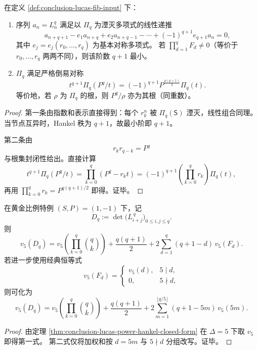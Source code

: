 \begin{proposition}[最小递推与倒易对称]\label{prop:conclusion-lucas-power-minpoly-reciprocity}
在定义 \ref{def:conclusion-lucas-fib-input} 下：
\begin{enumerate}
  \item 序列 \(a_n=L_n^q\) 满足以 \(\Pi_q\) 为湮灭多项式的线性递推
  \[
  a_{n+q+1}
  -e_1 a_{n+q}
  +e_2 a_{n+q-1}
  -\cdots
  +(-1)^{q+1}e_{q+1}a_n=0,
  \]
  其中 \(e_j=e_j(r_0,\dots,r_q)\) 为基本对称多项式。
  若 \(\prod_{d=1}^{q}F_d\neq 0\)（等价于 \(r_0,\dots,r_q\) 两两不同），则该阶数 \(q+1\) 最小。
  \item \(\Pi_q\) 满足严格倒易对称
  \[
  t^{q+1}\Pi_q(P^q/t)
  =
  (-1)^{q+1}P^{\frac{q(q+1)}{2}}\Pi_q(t).
  \]
  等价地，若 \(\rho\) 为 \(\Pi_q\) 的根，则 \(P^q/\rho\) 亦为其根（同重数）。
\end{enumerate}
\end{proposition}
\begin{proof}
第一条由指数和表示直接得到：每个 \(r_k^n\) 被 \(\Pi_q(\mathsf S)\) 湮灭，线性组合同理。
当节点互异时，Hankel 秩为 \(q+1\)，故最小阶即 \(q+1\)。

第二条由
\[
r_k r_{q-k}=P^q
\]
与根集封闭性给出。直接计算
\[
t^{q+1}\Pi_q(P^q/t)
=\prod_{k=0}^{q}(P^q-r_kt)
=(-1)^{q+1}\left(\prod_{k=0}^{q}r_k\right)\Pi_q(t),
\]
再用
\(
\prod_{k=0}^{q}r_k=P^{q(q+1)/2}
\)
即得。证毕。
\end{proof}

\begin{theorem}\label{thm:conclusion-golden-lucas-hankel-v5-rigidity}
在黄金比例特例 \((S,P)=(1,-1)\) 下，记
\[
D_q:=\det\!\big(L_{i+j}^{\,q}\big)_{0\le i,j\le q}.
\]
则
\[
v_5(D_q)
=
v_5\!\left(\prod_{k=0}^{q}\binom{q}{k}\right)
+\frac{q(q+1)}{2}
+2\sum_{d=1}^{q}(q+1-d)\,v_5(F_d).
\]
若进一步使用经典恒等式
\[
v_5(F_d)=
\begin{cases}
v_5(d),&5\mid d,\\
0,&5\nmid d,
\end{cases}
\]
则可化为
\[
v_5(D_q)
=
v_5\!\left(\prod_{k=0}^{q}\binom{q}{k}\right)
+\frac{q(q+1)}{2}
+2\sum_{m=1}^{\lfloor q/5\rfloor}(q+1-5m)\,v_5(5m).
\]
\end{theorem}
\begin{proof}
由定理 \ref{thm:conclusion-lucas-power-hankel-closed-form} 在 \(\Delta=5\) 下取 \(v_5\) 即得第一式。
第二式仅将加权和按 \(d=5m\) 与 \(5\nmid d\) 分组改写。证毕。
\end{proof}

\endinput

